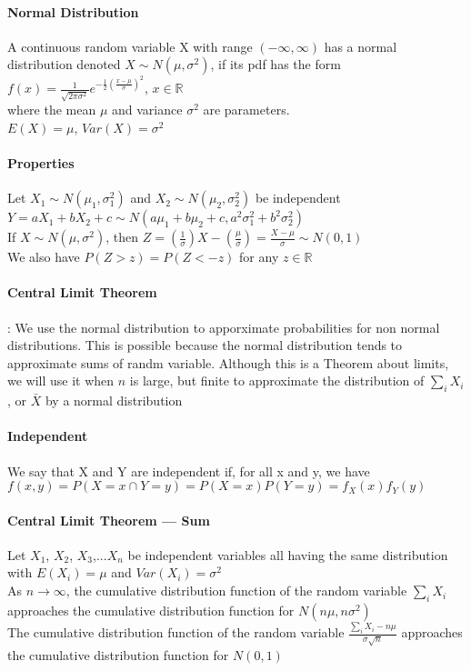 \documentclass[12pt]{report}
\begin{document}
    \paragraph{Normal Distribution} A continuous random variable X with range
      $(-\infty, \infty)$ has a normal distribution denoted $X \sim N(\mu,
      \sigma^2)$, if its pdf has the form $f(x) = \frac{1}{\sqrt{2\pi
      \sigma^2}}e^{-\frac{1}{2}(\frac{x-\mu}{\sigma})^2}$, $x \in \mathbb{R}$\\
      where the mean $\mu$ and variance $\sigma^2$ are parameters. \\
      $E(X) = \mu$, $Var(X) = \sigma^2$

    \paragraph{Properties}
      Let $X_1 \sim N(\mu_1, \sigma^2_1)$ and $X_2 \sim N(\mu_2, \sigma^2_2)$
      be independent\\
      $Y = aX_1 + bX_2 + c \sim N(a\mu_1 + b\mu_2 + c, a^2\sigma_1^2 +
      b^2\sigma^2_2)$\\
      If $X \sim N(\mu, \sigma^2)$, then $Z = (\frac{1}{\sigma})X -
      (\frac{\mu}{\sigma}) = \frac{X-\mu}{\sigma} \sim N(0, 1)$\\
      We also have $P(Z > z) = P(Z < -z)$ for any $z \in \mathbb{R}$

    \paragraph{Central Limit Theorem} : We use the normal distribution to
    apporximate probabilities for non normal distributions. This is possible
    because the normal distribution tends to approximate sums of randm
    variable. Although this is a Theorem about limits, we will use it when $n$
    is large, but finite to approximate the distribution of $\sum_i X_i$, or
    $\bar{X}$ by a normal distribution

    \paragraph{Independent} We say that X and Y are independent if, for all x
    and y, we have \\
    $f(x, y) = P(X = x \cap Y = y) = P(X = x)P(Y=y) = f_X(x)f_Y(y)$

    \paragraph{Central Limit Theorem --- Sum} Let $X_1$, $X_2$, $X_3$,...$X_n$
    be independent variables all having the same distribution with $E(X_i) =
    \mu$ and $Var(X_i) = \sigma^2$\\
    As $n \rightarrow \infty$, the cumulative distribution function of the
    random variable $\sum_i X_i$ approaches the cumulative distribution
    function for $N(n\mu, n\sigma^2)$\\
    The cumulative distribution function of the random variable $\frac{\sum_i
    X_i - n\mu}{\sigma \sqrt{n}}$ approaches the cumulative distribution
    function for $N(0, 1)$
\end{document}

